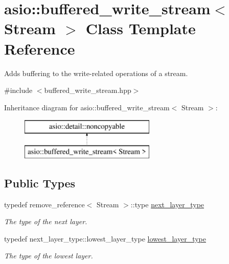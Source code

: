 \hypertarget{classasio_1_1buffered__write__stream}{}\section{asio\+:\+:buffered\+\_\+write\+\_\+stream$<$ Stream $>$ Class Template Reference}
\label{classasio_1_1buffered__write__stream}


Adds buffering to the write-\/related operations of a stream.  




{\ttfamily \#include $<$buffered\+\_\+write\+\_\+stream.\+hpp$>$}

Inheritance diagram for asio\+:\+:buffered\+\_\+write\+\_\+stream$<$ Stream $>$\+:\begin{figure}[H]
\begin{center}
\leavevmode
\includegraphics[height=2.000000cm]{classasio_1_1buffered__write__stream}
\end{center}
\end{figure}
\subsection*{Public Types}
\begin{DoxyCompactItemize}
\item 
typedef remove\+\_\+reference$<$ Stream $>$\+::type \hyperlink{classasio_1_1buffered__write__stream_a3de64e2c195304dba83b8ae5741be3f9}{next\+\_\+layer\+\_\+type}
\begin{DoxyCompactList}\small\item\em The type of the next layer. \end{DoxyCompactList}\item 
typedef next\+\_\+layer\+\_\+type\+::lowest\+\_\+layer\+\_\+type \hyperlink{classasio_1_1buffered__write__stream_af545c11f1e192498c8fa28743590191e}{lowest\+\_\+layer\+\_\+type}
\begin{DoxyCompactList}\small\item\em The type of the lowest layer. \end{DoxyCompactList}\end{DoxyCompactItemize}
